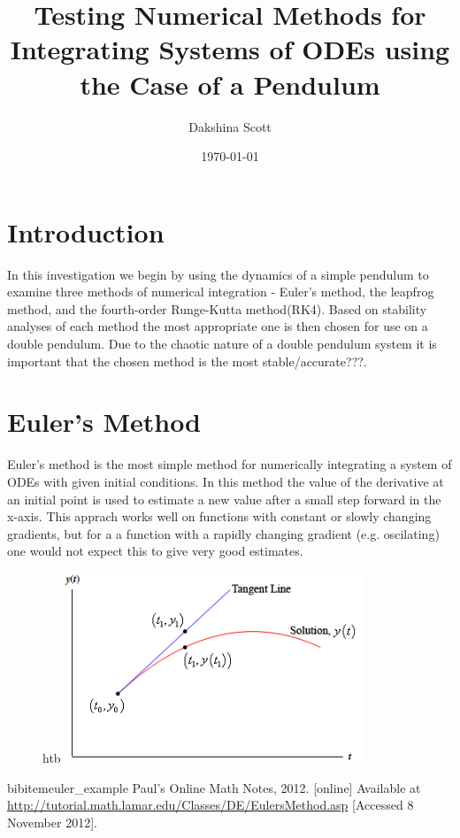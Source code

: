 \documentclass[a4paper,11pt,twoside]{article}
\begin{document}
\title{Testing Numerical Methods for Integrating Systems of ODEs using 
the Case of a Pendulum}
\author{Dakshina Scott}
\date{\today}
\maketitle

\begin{abstract}

\end{abstract}


\tableofcontents


\section{Introduction}
In this investigation we begin by using the dynamics of a simple 
pendulum to examine three methods of numerical integration - Euler's
method, the leapfrog method, and the fourth-order Runge-Kutta 
method(RK4). Based on stability analyses of each method the most 
appropriate one is then chosen for use on a double pendulum. Due to the 
chaotic nature of a double pendulum system it is important that 
the chosen method is the most stable/accurate???. 

\section{Euler's Method}
Euler's method is the most simple method for numerically integrating a 
system of ODEs with given initial conditions. In this method the value 
of the derivative at an initial point is used to estimate a new value 
after a small step forward in the x-axis. This apprach works well on
functions with constant or slowly changing gradients, but for a 
a function with a rapidly changing gradient (e.g. oscilating) one would 
not expect this to give very good estimates.

\begin{figure}{htb}
	\centering
	\includegraphics[width=0.8\textwidth]{euler_example.png}
	\caption{}
	\label{fig:euler_example}
\end{figure}
 
\begin{thebibliography}{20}

bibitem{euler_example}
Paul's Online Math Notes, 2012. [online] Available at \url{http://tutorial.math.lamar.edu/Classes/DE/EulersMethod.asp}
[Accessed 8 November 2012].

\end{thebibliography}
\end{document}
